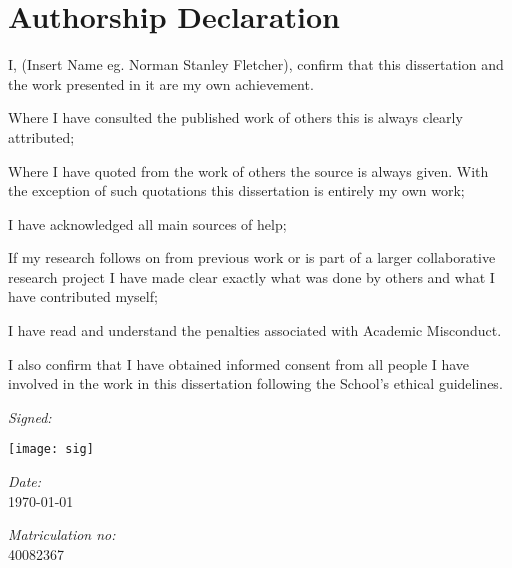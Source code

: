 
\section*{Authorship Declaration}
\vspace{0.5cm}
\begin{flushleft}
I, (Insert Name eg. Norman Stanley Fletcher), confirm that this dissertation and the work presented in it are my own achievement.\newline

Where I have consulted the published work of others this is always clearly attributed;\newline

Where I have quoted from the work of others the source is always given. With the exception of such quotations this dissertation is entirely my own work;\newline

I have acknowledged all main sources of help; \newline

If my research follows on from previous work or is part of a larger collaborative research project I have made clear exactly what was done by others and what I have contributed myself;\newline

I have read and understand the penalties associated with Academic Misconduct.\newline

I also confirm that I have obtained informed consent from all people I have involved in the work in this dissertation following the School's ethical guidelines.\newline
\end{flushleft}

\begin{flushleft} \large
\emph{Signed:} \\
\end{flushleft}
\texttt{[image: sig]}
\vspace{.5cm}

\begin{flushleft} \large
\emph{Date:} \\
\today
\end{flushleft}

\vspace{.5cm}

\begin{flushleft} \large
\emph{Matriculation no: } \\
40082367
\end{flushleft}